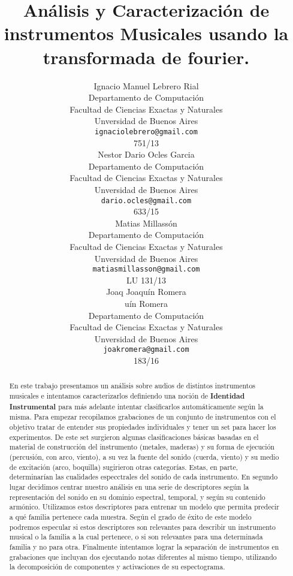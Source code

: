 \documentclass[13pt]{article}
\title{An\'alisis y Caracterizaci\'on de instrumentos Musicales usando la transformada de fourier.}
\author{
  Ignacio Manuel Lebrero Rial \\%
  Departamento de Computaci\'on\\
  Facultad de Ciencias Exactas y Naturales\\
  Unversidad de Buenos Aires \\
  \texttt{ignaciolebrero@gmail.com} \\
  751/13\\
   \And
 Nestor Dario Ocles Garcia \\
  Departamento de Computaci\'on\\
  Facultad de Ciencias Exactas y Naturales\\
  Unversidad de Buenos Aires \\
  \texttt{dario.ocles@gmail.com} \\
  633/15\\
  \And
  Matias Millassón\\
  Departamento de Computaci\'on\\
  Facultad de Ciencias Exactas y Naturales\\
  Unversidad de Buenos Aires \\
  \texttt{matiasmillasson@gmail.com} \\
  LU 131/13\\
  \And
   Joaq   Joaquín Romera\\

uín Romera\\
   Departamento de Computaci\'on\\
   Facultad de Ciencias Exactas y Naturales\\
   Unversidad de Buenos Aires \\
   \texttt{joakromera@gmail.com} \\
   183/16\\
}
\begin{document}
\maketitle

\begin{abstract}
   En este trabajo presentamos un análisis sobre audios de distintos instrumentos musicales e intentamos caracterizarlos definiendo una noci\'on de \textbf{Identidad Instrumental} para más adelante intentar clasificarlos automáticamente según la misma. Para empezar recopilamos grabaciones de un conjunto de instrumentos con el objetivo tratar de entender sus propiedades individuales y tener un set para hacer los experimentos. De este set surgieron algunas clasificaciones básicas basadas en el material de construcción del instrumento (metales, maderas) y su forma de ejecución (percusión, con arco, viento), a su vez la fuente del sonido (cuerda, viento) y su medio de excitación (arco, boquilla) sugirieron otras categorías. Estas, en parte, determinarían las cualidades especctrales del sonido de cada instrumento. En segundo lugar decidimos centrar nuestro análisis en una serie de descriptores según la representación del sonido en su dominio espectral, temporal, y según su contenido armónico. Utilizamos estos descriptores para entrenar un modelo que permita predecir a qué familia pertenece cada muestra. Según el grado de éxito de este modelo podremos especular si estos descriptores son relevantes para describir un instrumento musical o la familia a la cual pertenece, o si son relevantes para una determinada familia y no para otra. Finalmente intentamos lograr la separación de instrumentos en grabaciones que incluyan dos ejecutando notas diferentes al mismo tiempo, utilizando la decomposición de componentes y activaciones de su espectograma.
\end{abstract}



\clearpage


\newpage

\newpage

\newpage



\end{document}
